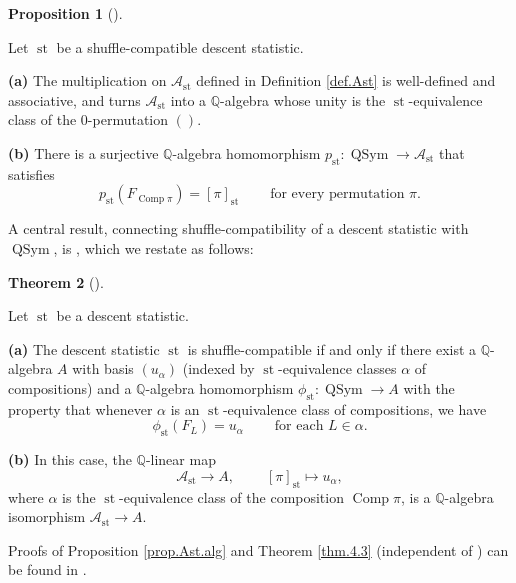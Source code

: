 \documentclass[numbers=enddot,12pt,final,onecolumn,notitlepage]{scrartcl}%
\theoremstyle{definition}
\newtheorem{theo}{Theorem}[section]
\newenvironment{theorem}[1][]
{\begin{theo}[#1]\begin{leftbar}}
{\end{leftbar}\end{theo}}
\newtheorem{prop}[theo]{Proposition}
\newenvironment{proposition}[1][]
{\begin{prop}[#1]\begin{leftbar}}
{\end{leftbar}\end{prop}}
\newenvironment{verlong}{}{}
\newenvironment{vershort}{}{}
\begin{document}
\begin{proposition}
\label{prop.Ast.alg}Let $\operatorname*{st}$ be a shuffle-compatible descent statistic.

\begin{verlong}
\textbf{(a)} The multiplication on $\mathcal{A}_{\operatorname*{st}}$ defined
in Definition \ref{def.Ast} is well-defined and associative, and turns
$\mathcal{A}_{\operatorname*{st}}$ into a $\mathbb{Q}$-algebra whose unity is
the $\operatorname*{st}$-equivalence class of the $0$-permutation
$\left( \right)$.

\textbf{(b)}
\end{verlong}
There is a surjective $\mathbb{Q}$-algebra homomorphism
$p_{\operatorname*{st}}:\operatorname*{QSym}\rightarrow\mathcal{A}%
_{\operatorname*{st}}$ that satisfies
\[
p_{\operatorname*{st}}\left(  F_{\operatorname*{Comp}\pi}\right)  =\left[
\pi\right]  _{\operatorname*{st}}\ \ \ \ \ \ \ \ \ \ \text{for every
permutation }\pi.
\]

\end{proposition}

A central result, connecting shuffle-compatibility of a descent
statistic with $\operatorname*{QSym}$, is \cite[Theorem 4.3]{part1},
which we restate as follows:

\begin{theorem}
\label{thm.4.3}Let $\operatorname*{st}$ be a descent statistic.

\textbf{(a)} The descent statistic $\operatorname*{st}$ is shuffle-compatible
if and only if there exist a $\mathbb{Q}$-algebra $A$ with basis $\left(
u_{\alpha}\right)  $ (indexed by $\operatorname*{st}$-equivalence classes
$\alpha$ of compositions) and a $\mathbb{Q}$-algebra homomorphism
$\phi_{\operatorname*{st}}:\operatorname*{QSym}\rightarrow A$ with the
property that whenever $\alpha$ is an $\operatorname*{st}$-equivalence class
of compositions, we have%
\[
\phi_{\operatorname*{st}}\left(  F_{L}\right)  =u_{\alpha}%
\ \ \ \ \ \ \ \ \ \ \text{for each }L\in\alpha.
\]


\textbf{(b)} In this case, the $\mathbb{Q}$-linear map%
\[
\mathcal{A}_{\operatorname*{st}}\rightarrow A,\ \ \ \ \ \ \ \ \ \ \left[
\pi\right]  _{\operatorname*{st}}\mapsto u_{\alpha},
\]
where $\alpha$ is the $\operatorname*{st}$-equivalence class of the
composition $\operatorname*{Comp}\pi$, is a $\mathbb{Q}$-algebra isomorphism
$\mathcal{A}_{\operatorname*{st}}\rightarrow A$.
\end{theorem}

\begin{vershort}
Proofs of Proposition \ref{prop.Ast.alg} and Theorem \ref{thm.4.3}
(independent of \cite{part1}) can be found in \cite{verlong}.
\end{vershort}
\end{document}
